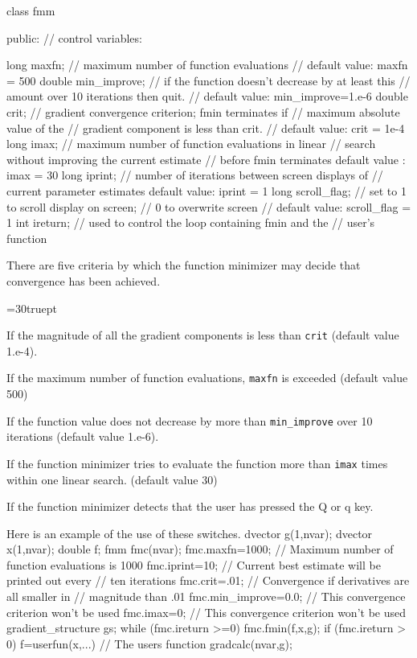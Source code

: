 \documentclass[12pt]{book}
\begin{document}
\beginexample
class fmm
{
public:
                        // control variables:

  long   maxfn;        // maximum number of function evaluations
                       // default value: maxfn = 500
  double min_improve;  // if the function doesn't decrease by at least this
                       // amount over 10 iterations then quit.
                       // default value: min_improve=1.e-6
  double crit;         // gradient convergence criterion; fmin terminates if
                       //   maximum absolute value of the
                       //   gradient component is less than crit.
                       //   default value: crit = 1e-4
  long   imax;         // maximum number of function evaluations in linear
                       // search without improving the current estimate
                       // before fmin terminates  default value : imax = 30
  long   iprint;       // number of iterations between screen displays of
                       // current parameter estimates default value: iprint = 1
  long   scroll_flag;  // set to 1 to scroll display on screen; 
                       //        0 to overwrite screen 
                       // default value: scroll_flag = 1
  int    ireturn;      // used to control the loop containing fmin and the
                       // user's function 
} 
\endexample
There are five criteria by which the function minimizer may decide that
convergence has been achieved.
{\parindent=30truept
\begin{description}
 If the magnitude of all the gradient components is less
than {\tt crit} (default value 1.e-4).

 If the maximum number of function evaluations, {\tt maxfn} is exceeded
(default value 500)

 If the function value does not decrease by more than
{\tt min\_improve} over 10 iterations (default value 1.e-6).

 If the function minimizer tries to evaluate the function
more than {\tt imax} times within one linear search. (default value 30)

 If the function minimizer detects that the user has pressed 
the Q or q key. 
\end{description}
\par }
Here is an example of the use of these switches.
\beginexample
dvector g(1,nvar);
dvector x(1,nvar);
double f;
fmm fmc(nvar);
fmc.maxfn=1000;       // Maximum number of function evaluations is 1000
fmc.iprint=10;        // Current best estimate will be printed out every
                      // ten iterations
fmc.crit=.01;         // Convergence if derivatives are all smaller in 
                      // magnitude than .01
fmc.min_improve=0.0;  // This convergence criterion won't be used
fmc.imax=0;           // This convergence criterion won't be used
gradient_structure gs;  
while (fmc.ireturn >=0)
{
  fmc.fmin(f,x,g);
  if (fmc.ireturn > 0)
  { 
    f=userfun(x,...) // The users function
    gradcalc(nvar,g);
  }
}
\endexample
\end{document}
